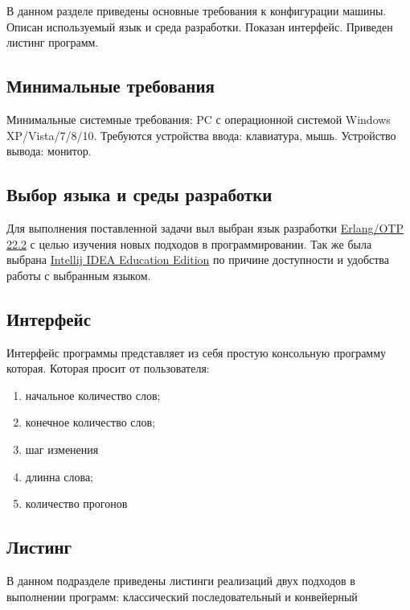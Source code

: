 \documentclass[../main.tex]{subfiles}
\begin{document}
	
	В данном разделе приведены основные требования к конфигурации машины. 
	Описан используемый язык и среда разработки.
	Показан интерфейс.
	Приведен листинг программ.
	
\subsection{Минимальные требования}

	Минимальные системные требования: PC с операционной системой Windows XP/Vista/7/8/10. 
	Требуются устройства ввода: клавиатура, мышь. 
	Устройство вывода: монитор.

\subsection{Выбор языка и среды разработки}

	Для выполнения поставленной задачи выл выбран язык разработки \href{https://www.erlang.org/downloads}{Erlang/OTP 22.2} с целью изучения новых подходов в программировании.
	Так же была выбрана \href{https://www.jetbrains.com/idea/}{Intellij IDEA Education Edition} по причине доступности и удобства работы с выбранным языком.

\subsection{Интерфейс}

	Интерфейс программы представляет из себя простую консольную программу которая. Которая просит от пользователя:
	\begin{enumerate}
		\item начальное количество слов;
		\item конечное количество слов;
		\item шаг изменения
		\item длинна слова;
		\item количество прогонов
	\end{enumerate}

\subsection{Листинг}
	
	В данном подразделе приведены листинги реализаций двух подходов в выполнении программ: классический последовательный и конвейерный
	
	
	
	
\end{document}
